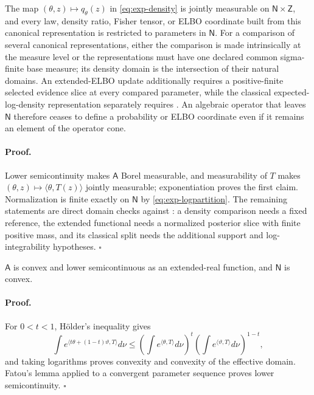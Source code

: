 The map $(\theta,z)\mapsto q_\theta(z)$ in \eqref{eq:exp-density} is jointly measurable on $\mathsf N\times\mathsf Z$, and every law, density ratio, Fisher tensor, or ELBO coordinate built from this canonical representation is restricted to parameters in $\mathsf N$. For a comparison of several canonical representations, either the comparison is made intrinsically at the measure level or the representations must have one declared common sigma-finite base measure; its density domain is the intersection of their natural domains. An extended-ELBO update additionally requires a positive-finite selected evidence slice at every compared parameter, while the classical expected-log-density representation separately requires . An algebraic operator that leaves $\mathsf N$ therefore ceases to define a probability or ELBO coordinate even if it remains an element of the operator cone. 

\paragraph{Proof.}
Lower semicontinuity makes $\mathsf A$ Borel measurable, and measurability of $T$ makes $(\theta,z)\mapsto\langle\theta,T(z)\rangle$ jointly measurable; exponentiation proves the first claim. Normalization is finite exactly on $\mathsf N$ by \eqref{eq:exp-logpartition}. The remaining statements are direct domain checks against : a density comparison needs a fixed reference, the extended functional needs a normalized posterior slice with finite positive mass, and its classical split needs the additional support and log-integrability hypotheses. \(\square\)

\(\mathsf A\) is convex and lower semicontinuous as an extended-real
function, and \(\mathsf N\) is convex. 

\paragraph{Proof.}
For \(0<t<1\), H\"older's inequality gives
\begin{equation}
\int e^{\langle t\theta+(1-t)\vartheta,T\rangle}d\nu
\leq
\left(\int e^{\langle\theta,T\rangle}d\nu\right)^t
\left(\int e^{\langle\vartheta,T\rangle}d\nu\right)^{1-t},
\label{eq:exp-holder}
\end{equation}
and taking logarithms proves convexity and convexity of the effective domain.
Fatou's lemma applied to a convergent parameter sequence proves lower
semicontinuity. \(\square\)

